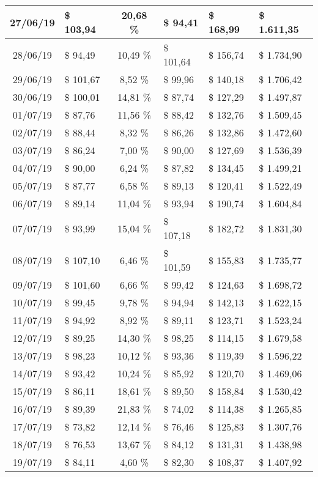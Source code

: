 \begin{center}
\begin{small}
\begin{longtable}{|c|l|c|l|l|l|}
27/06/19 & \$ 103,94 & 20,68 \% & \$ 94,41 & \$ 168,99 & \$ 1.611,35 \\ \hline
28/06/19 & \$ 94,49 & 10,49 \% & \$ 101,64 & \$ 156,74 & \$ 1.734,90 \\ \hline
29/06/19 & \$ 101,67 & 8,52 \% & \$ 99,96 & \$ 140,18 & \$ 1.706,42 \\ \hline
30/06/19 & \$ 100,01 & 14,81 \% & \$ 87,74 & \$ 127,29 & \$ 1.497,87 \\ \hline
01/07/19 & \$ 87,76 & 11,56 \% & \$ 88,42 & \$ 132,76 & \$ 1.509,45 \\ \hline
02/07/19 & \$ 88,44 & 8,32 \% & \$ 86,26 & \$ 132,86 & \$ 1.472,60 \\ \hline
03/07/19 & \$ 86,24 & 7,00 \% & \$ 90,00 & \$ 127,69 & \$ 1.536,39 \\ \hline
04/07/19 & \$ 90,00 & 6,24 \% & \$ 87,82 & \$ 134,45 & \$ 1.499,21 \\ \hline
05/07/19 & \$ 87,77 & 6,58 \% & \$ 89,13 & \$ 120,41 & \$ 1.522,49 \\ \hline
06/07/19 & \$ 89,14 & 11,04 \% & \$ 93,94 & \$ 190,74 & \$ 1.604,84 \\ \hline
07/07/19 & \$ 93,99 & 15,04 \% & \$ 107,18 & \$ 182,72 & \$ 1.831,30 \\ \hline
08/07/19 & \$ 107,10 & 6,46 \% & \$ 101,59 & \$ 155,83 & \$ 1.735,77 \\ \hline
09/07/19 & \$ 101,60 & 6,66 \% & \$ 99,42 & \$ 124,63 & \$ 1.698,72 \\ \hline
10/07/19 & \$ 99,45 & 9,78 \% & \$ 94,94 & \$ 142,13 & \$ 1.622,15 \\ \hline
11/07/19 & \$ 94,92 & 8,92 \% & \$ 89,11 & \$ 123,71 & \$ 1.523,24 \\ \hline
12/07/19 & \$ 89,25 & 14,30 \% & \$ 98,25 & \$ 114,15 & \$ 1.679,58 \\ \hline
13/07/19 & \$ 98,23 & 10,12 \% & \$ 93,36 & \$ 119,39 & \$ 1.596,22 \\ \hline
14/07/19 & \$ 93,42 & 10,24 \% & \$ 85,92 & \$ 120,70 & \$ 1.469,06 \\ \hline
15/07/19 & \$ 86,11 & 18,61 \% & \$ 89,50 & \$ 158,84 & \$ 1.530,42 \\ \hline
16/07/19 & \$ 89,39 & 21,83 \% & \$ 74,02 & \$ 114,38 & \$ 1.265,85 \\ \hline
17/07/19 & \$ 73,82 & 12,14 \% & \$ 76,46 & \$ 125,83 & \$ 1.307,76 \\ \hline
18/07/19 & \$ 76,53 & 13,67 \% & \$ 84,12 & \$ 131,31 & \$ 1.438,98 \\ \hline
19/07/19 & \$ 84,11 & 4,60 \% & \$ 82,30 & \$ 108,37 & \$ 1.407,92 \\ \hline

\end{longtable}
\end{small}
\end{center}
